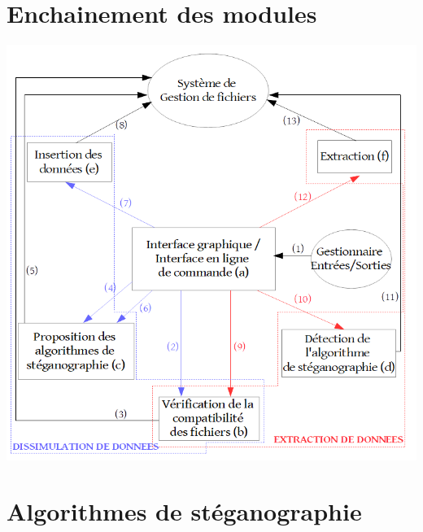 \documentclass{beamer}
\begin{document}
  \section{Enchainement des modules}
  \begin{frame}
  \hspace{1.5cm}
  \includegraphics[scale=0.25]{pictures/organigramme_extraction.png}
  \end{frame}
  
  \section{Algorithmes de stéganographie} %
  
\end{document}
